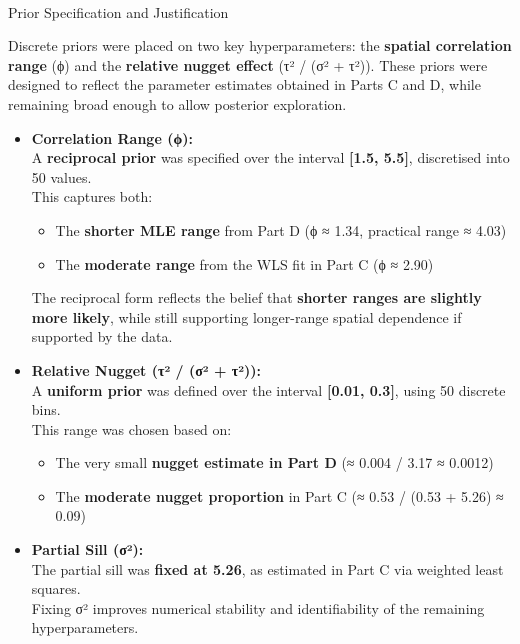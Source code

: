 \documentclass[
  11pt,
]{article}
\makeatletter
\let\oldparagraph\paragraph
\renewcommand{\paragraph}{
    \@ifstar
      \xxxParagraphStar
      \xxxParagraphNoStar
  }
\newcommand{\xxxParagraphStar}[1]{\oldparagraph*{#1}\mbox{}}
\newcommand{\xxxParagraphNoStar}[1]{\oldparagraph{#1}\mbox{}}
\makeatother
\begin{document}
\paragraph{Prior Specification and
Justification}\label{prior-specification-and-justification}

Discrete priors were placed on two key hyperparameters: the
\textbf{spatial correlation range} (ϕ) and the \textbf{relative nugget
effect} (τ² / (σ² + τ²)). These priors were designed to reflect the
parameter estimates obtained in Parts C and D, while remaining broad
enough to allow posterior exploration.

\begin{itemize}
\item
  \textbf{Correlation Range (ϕ):}\\
  A \textbf{reciprocal prior} was specified over the interval
  \textbf{{[}1.5, 5.5{]}}, discretised into 50 values.\\
  This captures both:

  \begin{itemize}
  \item
    The \textbf{shorter MLE range} from Part D (ϕ ≈ 1.34, practical
    range ≈ 4.03)
  \item
    The \textbf{moderate range} from the WLS fit in Part C (ϕ ≈ 2.90)
  \end{itemize}

  The reciprocal form reflects the belief that \textbf{shorter ranges
  are slightly more likely}, while still supporting longer-range spatial
  dependence if supported by the data.
\item
  \textbf{Relative Nugget (τ² / (σ² + τ²)):}\\
  A \textbf{uniform prior} was defined over the interval
  \textbf{{[}0.01, 0.3{]}}, using 50 discrete bins.\\
  This range was chosen based on:

  \begin{itemize}
  \item
    The very small \textbf{nugget estimate in Part D} (≈ 0.004 / 3.17 ≈
    0.0012)
  \item
    The \textbf{moderate nugget proportion} in Part C (≈ 0.53 / (0.53 +
    5.26) ≈ 0.09)
  \end{itemize}
\item
  \textbf{Partial Sill (σ²):}\\
  The partial sill was \textbf{fixed at 5.26}, as estimated in Part C
  via weighted least squares.\\
  Fixing σ² improves numerical stability and identifiability of the
  remaining hyperparameters.
\end{itemize}
\end{document}
